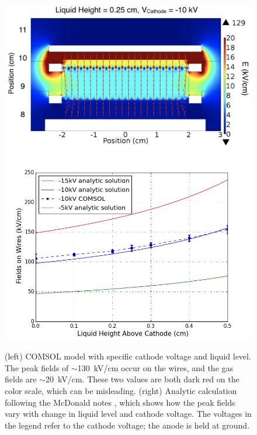 \begin{figure}[htbp]
\begin{center}
\includegraphics[width=\halffig]{figures/testbed/COMSOL.png}
\includegraphics[width=\halffig]{figures/testbed/FieldsOnWires_withCOMSOL.png}
\caption{(left) COMSOL model with specific cathode voltage and liquid level. The peak fields of $\sim$130~kV/cm occur on the wires, and the gas fields are $\sim$20~kV/cm. These two values are both dark red on the color scale, which can be misleading. (right) Analytic calculation following the McDonald notes \cite{McDonald2003}, which shows how the peak fields vary with change in liquid level and cathode voltage. The voltages in the legend refer to the cathode voltage; the anode is held at ground.}
\label{fig:fields_on_wires}
\end{center}
\end{figure}

